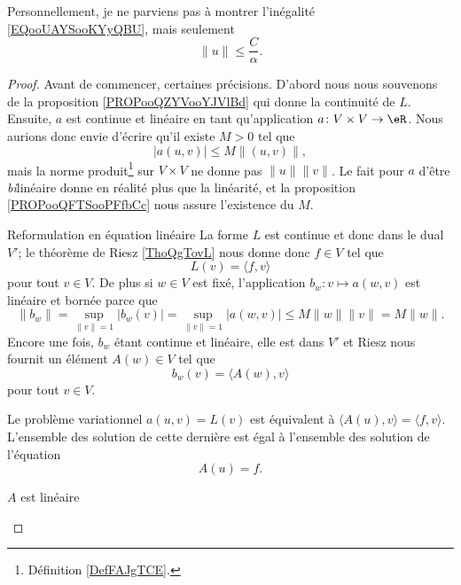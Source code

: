 \begin{probleme}
    Personnellement, je ne parviens pas à montrer l'inégalité \eqref{EQooUAYSooKYyQBU}, mais seulement
    \begin{equation}
        \| u \|\leq \frac{ C }{ \alpha }.
    \end{equation}
\end{probleme}

\begin{proof}
    Avant de commencer, certaines précisions. D'abord nous nous souvenons de la proposition \ref{PROPooQZYVooYJVlBd} qui donne la continuité de \( L\). Ensuite, \( a\) est continue et linéaire en tant qu'application \( a\colon V\times V\to \eR\). Nous aurions donc envie d'écrire qu'il existe \( M>0\) tel que
    \begin{equation}
        | a(u,v) |\leq M\| (u,v) \|,
    \end{equation}
    mais la norme produit\footnote{Définition \ref{DefFAJgTCE}.} sur \( V\times V\) ne donne pas \( \| u \|\| v \|\). Le fait pour \( a\) d'être \emph{bi}linéaire donne en réalité plus que la linéarité, et la proposition \ref{PROPooQFTSooPFfbCc} nous assure l'existence du \( M\).

    \begin{subproof}
        \item[Reformulation en équation linéaire]
            La forme \( L\) est continue et donc dans le dual \( V'\); le théorème de Riesz \ref{ThoQgTovL} nous donne donc \( f\in V\) tel que
            \begin{equation}
                L(v)=\langle f, v\rangle 
            \end{equation}
            pour tout \( v\in V\). De plus si \( w\in V\) est fixé, l'application \( b_w\colon v\mapsto a(w,v)\) est linéaire et bornée parce que
            \begin{equation}
                \| b_w \|=\sup_{\| v \|=1}| b_w(v) |=\sup_{\| v \|=1}| a(w,v) |\leq M\| w \|\| v \|=M\| w \|.   
            \end{equation}
            Encore une fois, \( b_w\) étant continue et linéaire, elle est dans \( V'\) et Riesz nous fournit un élément \( A(w)\in V\) tel que
            \begin{equation}
                b_w(v)=\langle A(w), v\rangle 
            \end{equation}
            pour tout \( v\in V\). 

            Le problème variationnel \( a(u,v)=L(v)\) est équivalent à \( \langle A(u), v\rangle =\langle f, v\rangle \). L'ensemble des solution de cette dernière est égal à l'ensemble des solution de l'équation
            \begin{equation}        \label{EQooLPMPooMVuYUX}
                A(u)=f.
            \end{equation}
        \item[\( A\) est linéaire]


\end{subproof}
\end{proof}
